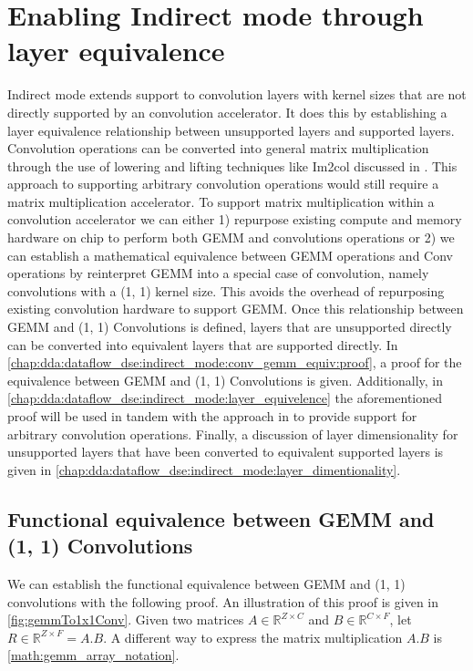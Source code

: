 \clearpage 

\section{Enabling Indirect mode through layer equivalence}
\label{chap:dda:dataflow_dse:indirect_mode}

Indirect mode extends support to convolution layers with kernel sizes that are
not directly supported by an convolution accelerator. It does this by
establishing a layer equivalence relationship between unsupported layers and
supported layers. Convolution operations can be converted into general matrix
multiplication through the use of lowering and lifting techniques like Im2col
discussed in \cite{cafe_con_troll}. This approach to supporting arbitrary
convolution operations would still require a matrix multiplication accelerator.
To support matrix multiplication within a convolution accelerator we can either
1) repurpose existing compute and memory hardware on chip to perform both GEMM
and convolutions operations or 2) we can establish a mathematical equivalence
between GEMM operations and Conv operations by reinterpret GEMM into a special
case of convolution, namely convolutions with a (1, 1) kernel size. This avoids the
overhead of repurposing existing convolution hardware to support GEMM. Once this
relationship between GEMM and (1, 1) Convolutions is defined, layers that are
unsupported directly can be converted into equivalent layers that are supported
directly. In
\autoref{chap:dda:dataflow_dse:indirect_mode:conv_gemm_equiv:proof}, a proof for
the equivalence between GEMM and (1, 1) Convolutions is given. Additionally, in
\autoref{chap:dda:dataflow_dse:indirect_mode:layer_equivelence} the
aforementioned proof will be used in tandem with the approach in
\cite{cafe_con_troll} to provide support for arbitrary convolution operations.
Finally, a discussion of layer dimensionality for unsupported layers that have
been converted to equivalent supported layers is given in
\autoref{chap:dda:dataflow_dse:indirect_mode:layer_dimentionality}.  

\clearpage

\subsection{Functional equivalence between GEMM and (1, 1) Convolutions}
\label{chap:dda:dataflow_dse:indirect_mode:conv_gemm_equiv:proof}

We can establish the functional equivalence between GEMM and (1, 1) convolutions with
the following proof. An illustration of this proof is given in
\autoref{fig:gemmTo1x1Conv}.  
Given two matrices $A\in \mathbb{R}^{Z \times C}$ and $B \in \mathbb{R}^{C
\times F}$, let $R \in \mathbb{R}^{Z\times F} = A.B$. A different way to express
the matrix multiplication $A.B$ is \autoref{math:gemm_array_notation}.  

